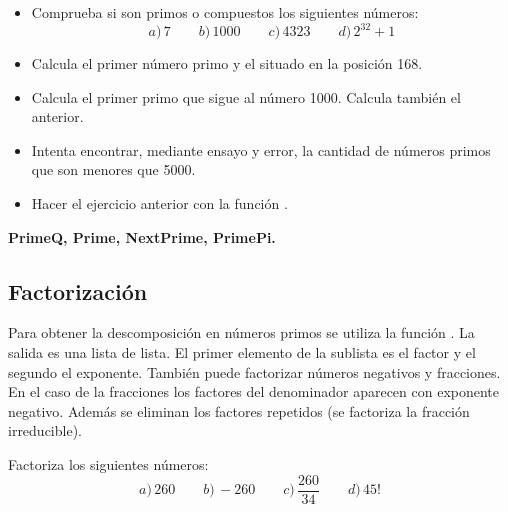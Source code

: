 \documentclass[a4paper,10pt, draft]{article}
\newcommand{\com}[1]{\textbf{\color{blue}{#1}}}
\newenvironment{ejer}{\begin{tcolorbox}[center title, title=Ejercicios,
fonttitle=\sffamily\bfseries,colback=blue!5,colframe=orange]}{\end{tcolorbox}}
\newenvironment{funciones}{\begin{tcolorbox}[center title, title=Nuevas funciones, fonttitle=\sffamily\bfseries, colback=green!5!white,colframe=red!75!black]}{\end{tcolorbox}\bigskip}
\begin{document}
\begin{ejer}

\begin{itemize}

\item Comprueba si son primos o compuestos los siguientes números:
$$ a)\, 7 \qquad b)\,1000 \qquad c)\,4323 \qquad d)\, 2^{32}+1$$

\item Calcula el primer número primo y el situado en la posición 168.

\item  Calcula el primer primo que sigue al número 1000. Calcula también el anterior.

\item Intenta encontrar, mediante ensayo y error, la cantidad de números primos que son menores que 5000.

\item Hacer el ejercicio anterior con la función \com{PrimePi[x]}.

\end{itemize}

\end{ejer} 
\enlargethispage{1 cm}

\begin{funciones}

\textbf{PrimeQ, Prime, NextPrime, PrimePi.}


\end{funciones}


 \newpage

\subsection{Factorización}

Para obtener la descomposición en números primos se utiliza la función \com{FactorInteger[n]}. La salida es una lista de lista. El primer elemento de la sublista es el factor y el segundo el exponente. También puede factorizar números negativos y fracciones. En el caso de la fracciones los factores del denominador aparecen con exponente negativo. Además se eliminan los factores repetidos (se factoriza la fracción irreducible).

\begin{ejer}

Factoriza los siguientes números:
$$
a)\, 260 \qquad b)\,-260\qquad c)\, \frac{260}{34} \qquad d)\, 45!
$$ 

\end{ejer} 
\end{document}
